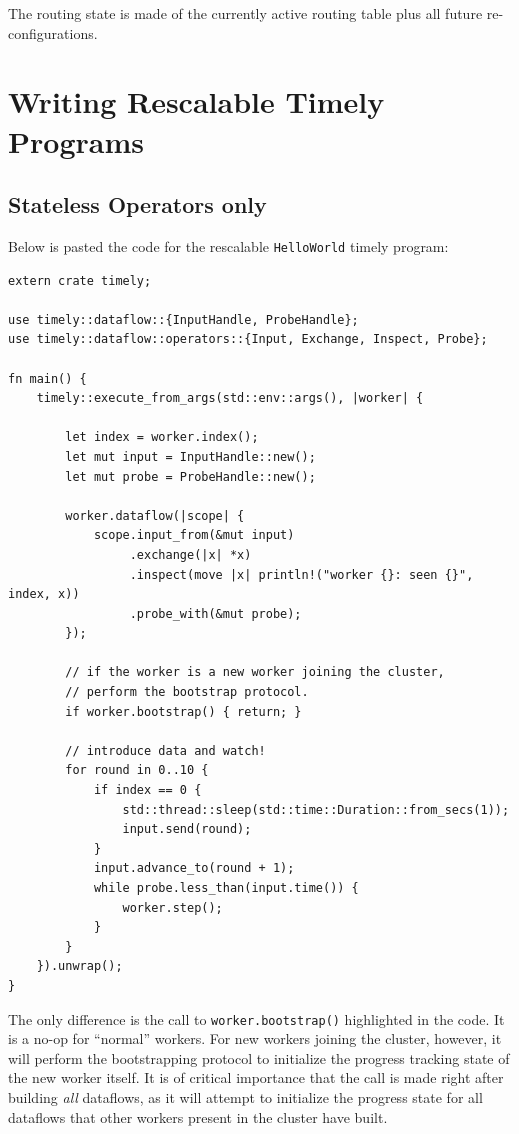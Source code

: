 \documentclass[12pt]{extarticle}
\begin{document}
The routing state is made of the currently active routing table plus all future re-configurations.

\section{Writing Rescalable Timely Programs}

\subsection{Stateless Operators only}

Below is pasted the code for the rescalable \verb|HelloWorld| timely program:

\begin{verbatim}
extern crate timely;

use timely::dataflow::{InputHandle, ProbeHandle};
use timely::dataflow::operators::{Input, Exchange, Inspect, Probe};

fn main() {
    timely::execute_from_args(std::env::args(), |worker| {

        let index = worker.index();
        let mut input = InputHandle::new();
        let mut probe = ProbeHandle::new();

        worker.dataflow(|scope| {
            scope.input_from(&mut input)
                 .exchange(|x| *x)
                 .inspect(move |x| println!("worker {}: seen {}", index, x))
                 .probe_with(&mut probe);
        });

        // if the worker is a new worker joining the cluster,
        // perform the bootstrap protocol.
        if worker.bootstrap() { return; }

        // introduce data and watch!
        for round in 0..10 {
            if index == 0 {
                std::thread::sleep(std::time::Duration::from_secs(1));
                input.send(round);
            }
            input.advance_to(round + 1);
            while probe.less_than(input.time()) {
                worker.step();
            }
        }
    }).unwrap();
}
\end{verbatim}

The only difference is the call to \verb|worker.bootstrap()| highlighted in the code.
It is a no-op for ``normal'' workers. For new workers joining the cluster, however,
it will perform the bootstrapping protocol to initialize the progress tracking state of the new worker itself.
It is of critical importance that the call is made right after building \textit{all} dataflows,
as it will attempt to initialize the progress state for all dataflows that other workers present
in the cluster have built.
\end{document}
